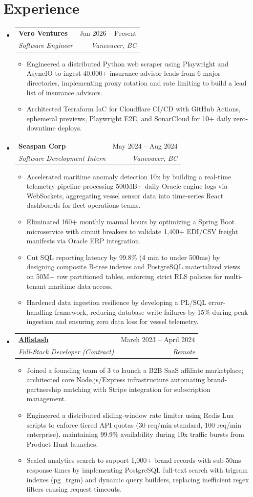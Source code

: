 \documentclass[a4paper,10pt]{article}
\makeatletter
\newcommand{\resumeItem}[1]{
  \item\small{
    {#1 \vspace{-1pt}}
  }
}
\newcommand{\resumeSubheading}[4]{
  \vspace{1pt}\item
    \begin{tabular*}{0.97\textwidth}[t]{l@{\extracolsep{\fill}}r}
      \textbf{#1} & #2 \\
      \textit{\small#3} & \textit{\small #4} \\
    \end{tabular*}\vspace{-6pt}
}
\newcommand{\resumeItemListStart}{\begin{itemize}[itemsep=2pt]}
\newcommand{\resumeItemListEnd}{\end{itemize}\vspace{-2pt}}
\makeatother
\begin{document}
\section{Experience}
  \begin{itemize}[leftmargin=0.15in, label={}]

    \resumeSubheading
      {Vero Ventures}{Jan 2026 -- Present}
      {Software Engineer}{Vancouver, BC}
      \resumeItemListStart
        \resumeItem{Engineered a distributed Python web scraper using Playwright and AsyncIO to ingest 40,000+ insurance advisor leads from 6 major directories, implementing proxy rotation and rate limiting to build a lead list of insurance advisors.}
       \resumeItem{Architected Terraform IaC for Cloudflare CI/CD with GitHub Actions, ephemeral previews, Playwright E2E, and SonarCloud for 10+ daily zero-downtime deploys.}
      \resumeItemListEnd

  \resumeSubheading
      {Seaspan Corp}{May 2024 -- Aug 2024}
      {Software Development Intern}{Vancouver, BC}
      \resumeItemListStart
        \resumeItem{Accelerated maritime anomaly detection 10x by building a real-time telemetry pipeline processing 500MB+ daily Oracle engine logs via WebSockets, aggregating vessel sensor data into time-series React dashboards for fleet operations teams.}
        \resumeItem{Eliminated 160+ monthly manual hours by optimizing a Spring Boot microservice with circuit breakers to validate 1,400+ EDI/CSV freight manifests via Oracle ERP integration.}
        \resumeItem{Cut SQL reporting latency by 99.8\% (4 min to under 500ms) by designing composite B-tree indexes and PostgreSQL materialized views on 50M+ row partitioned tables, enforcing strict RLS policies for multi-tenant maritime data access.}
        \resumeItem{Hardened data ingestion resilience by developing a PL/SQL error-handling framework, reducing database write-failures by 15\% during peak ingestion and ensuring zero data loss for vessel telemetry.}
      \resumeItemListEnd

    \resumeSubheading
      {\href{https://affistash.com }{\textbf{\underline{Affistash}}}}{March 2023 -- April 2024}
      {Full-Stack Developer (Contract)}{Remote}
      \resumeItemListStart
        \resumeItem{Joined a founding team of 3 to launch a B2B SaaS affiliate marketplace; architected core Node.js/Express infrastructure automating brand-partnership matching with Stripe integration for subscription management.}
        \resumeItem{Engineered a distributed sliding-window rate limiter using Redis Lua scripts to enforce tiered API quotas (30 req/min standard, 100 req/min enterprise), maintaining 99.9\% availability during 10x traffic bursts from Product Hunt launches.}
        \resumeItem{Scaled analytics search to support 1,000+ brand records with sub-50ms response times by implementing PostgreSQL full-text search with trigram indexes (pg\_trgm) and dynamic query builders, replacing inefficient regex filters causing request timeouts.}
      \resumeItemListEnd

  \end{itemize}
\end{document}
